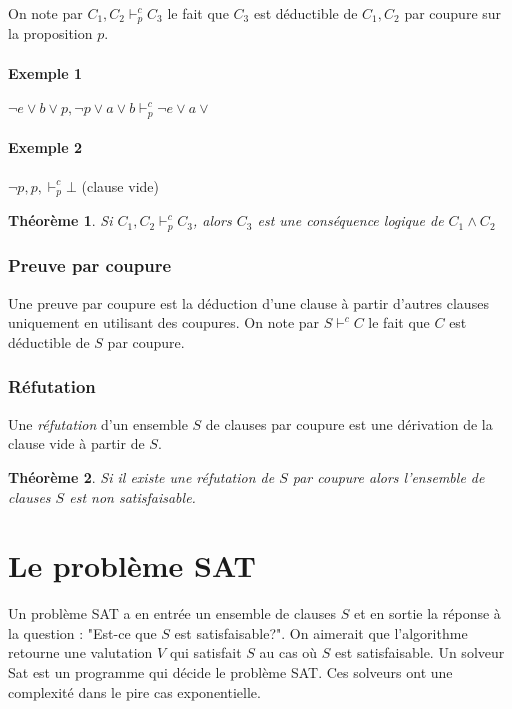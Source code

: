 \documentclass[a4paper]{article}
\newtheorem{theorem}{Théorème}[section]
\begin{document}
  On note par $C_1, C_2 \vdash^c_p C_3$ le fait que $C_3$ est déductible de 
  $C_1, C_2$ par coupure sur la proposition $p$.

  \paragraph{Exemple 1} $ \lnot e \lor b \lor p, \lnot p \lor a \lor b \vdash^c_p \lnot e \lor a \lor $
  \paragraph{Exemple 2} $ \lnot p, p, \vdash^c_p \bot $ (clause vide)

  \begin{theorem}
  Si $C_1, C_2 \vdash^c_p C_3$, alors $C_3$ est une conséquence logique de $C_1 \land C_2$
  \end{theorem}

  \subsubsection{Preuve par coupure}
  Une preuve par coupure est la déduction d'une clause à partir d'autres clauses uniquement
  en utilisant des coupures. On note par $S \vdash^c C$ le fait que $C$ est déductible de $S$ par coupure.

  \subsubsection{Réfutation}
  Une \textit{réfutation} d'un ensemble $S$ de clauses par coupure est une dérivation
  de la clause vide à partir de $S$.

  \begin{theorem}
  Si il existe une réfutation de $S$ par coupure alors l'ensemble de clauses $S$
  est non satisfaisable.
  \end{theorem}


\section{Le problème SAT}

  Un problème SAT a en entrée un ensemble de clauses $S$ et en sortie la réponse à 
  la question : "Est-ce que $S$ est satisfaisable?". On aimerait que l'algorithme
  retourne une valutation $V$ qui satisfait $S$ au cas où $S$ est satisfaisable.
  Un solveur Sat est un programme qui décide le  problème SAT. Ces solveurs
  ont une complexité dans le pire cas exponentielle.
\end{document}
